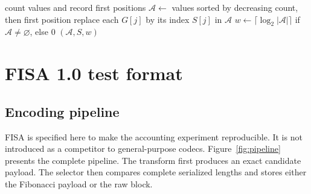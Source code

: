 \documentclass[a4paper,fleqn]{cas-dc}
\begin{document}
\begin{algorithm}[t]
\caption{\texttt{ExtractAlphabet($G$)}}
\label{alg:alphabet}
count values and record first positions\;
$\mathcal{A}\leftarrow$ values sorted by decreasing count, then first position\;
replace each $G[j]$ by its index $S[j]$ in $\mathcal{A}$\;
$w\leftarrow\lceil\log_2|\mathcal{A}|\rceil$ if $\mathcal{A}\neq\varnothing$, else $0$\;
\Return $(\mathcal{A},S,w)$\;
\end{algorithm}

\section{FISA 1.0 test format}
\label{sec:method}

\subsection{Encoding pipeline}

FISA is specified here to make the accounting experiment reproducible. It is
not introduced as a competitor to general-purpose codecs.
Figure~\ref{fig:pipeline} presents the complete pipeline. The transform first
produces an exact candidate payload. The selector then compares complete
serialized lengths and stores either the Fibonacci payload or the raw block.
\end{document}
